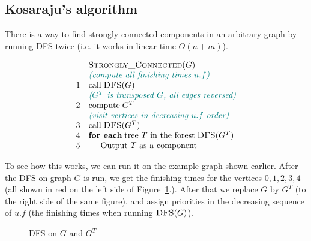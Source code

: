 \documentclass[a4paper,12pt]{article}
\begin{document}
\subsection{Kosaraju's algorithm} 

There is a way to find strongly connected components in an 
arbitrary graph by 
running DFS twice (i.e. it works in linear time $O(n+m)$). 


$$\begin{array}{rl}
  & \text{\sc Strongly\textunderscore{}Connected}(G)\\
  & \textcolor{teal}{\text{\em (compute all finishing times $u.f$)}}\\
1 & \text{call}\;\text{\sc DFS}(G)\\
  & \textcolor{teal}{\text{\em ($G^T$ is transposed $G$, all edges reversed)}}\\
2 & \text{compute}\;G^{T}\\
  & \textcolor{teal}{\text{\em (visit vertices in decreasing $u.f$ order)}}\\
3 & \text{call}\;\text{\sc DFS}(G^T)\\
4 & \text{\bf for each}\;\text{tree $T$ in the forest}\;\text{\sc DFS}(G^T)\\
5 & \hspace{0.5cm} \text{Output $T$ as a component}\\
\end{array}$$

To see how this works, we can run it on the example graph shown earlier. 
After the DFS on graph $G$ is run, we get the finishing times 
for the vertices $0,1,2,3,4$ (all shown in red on the left side 
of Figure~\ref{fig:strongly-connected-dfs}.). 
After that we replace $G$ by $G^T$ (to the right side of 
the same figure), and assign priorities in the decreasing sequence
of $u.f$ (the finishing times when running $\text{\sc DFS}(G)$). 

\begin{figure}[!htb]
\caption{\label{fig:strongly-connected-dfs} DFS on $G$ and $G^T$}
\end{figure}
\end{document}
